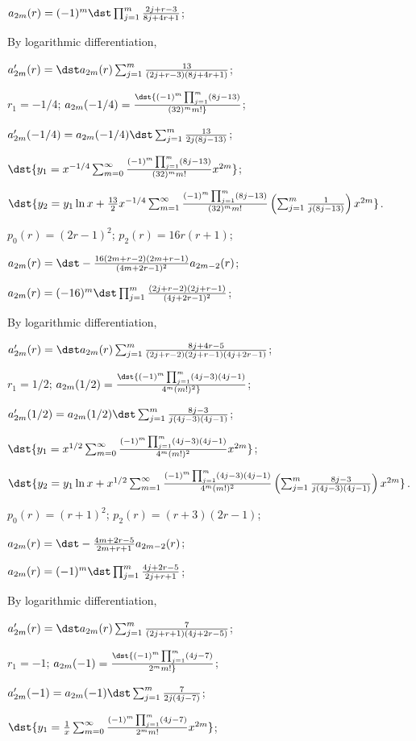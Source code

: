 \documentclass[dvips]{book}
\renewcommand{\exer}[1]{\par\medskip\;\noindent{\color{red}\bf #1.}}
\numberwithin{example}{section}
\numberwithin{equation}{section}
\numberwithin{theorem}{section}
\numberwithin{table}{section}
\numberwithin{figure}{section}
\begin{document}
 $a_{2m}(r)=(-1)^m\dst\prod_{j=1}^m{2j+r-3\over8j+4r+1}$;

By logarithmic differentiation,

$a_{2m}'(r)=\dst a_{2m}(r)\sum_{j=1}^m{13\over(2j+r-3)(8j+4r+1)}$;

$r_1=-1/4$;
$a_{2m}(-1/4)=\dst{(-1)^m\prod_{j=1}^m(8j-13)\over(32)^mm!}$;

$a_{2m}'(-1/4)=a_{2m}(-1/4)\dst\sum_{j=1}^m{13\over2j(8j-13)}$;


$\dst{y_1=x^{-1/4}\sum_{m=0}^\infty{(-1)^m\prod_{j=1}^m(8j-13)\over(32)^mm!}
x^{2m}}$;

$\dst{y_2=y_1\ln
x+{13\over2}x^{-1/4}\sum_{m=1}^\infty{(-1)^m\prod_{j=1}^m(8j-13)\over(32)^mm!}
\left(\sum_{j=1}^m{1\over j(8j-13)}\right)x^{2m}}$.


\exer{7.6.36}
$p_0(r)=(2r-1)^2$;
$p_2(r)=16r(r+1)$;

$a_{2m}(r)=\dst-{16(2m+r-2)(2m+r-1)\over(4m+2r-1)^2}
a_{2m-2}(r)$;


$a_{2m}(r)=(-16)^m\dst\prod_{j=1}^m{(2j+r-2)(2j+r-1)\over(4j+2r-1)^2}$;

By logarithmic differentiation,

$a_{2m}'(r)=\dst
a_{2m}(r)\sum_{j=1}^m{8j+4r-5\over(2j+r-2)(2j+r-1)(4j+2r-1)}$;

$r_1=1/2$;
$a_{2m}(1/2)=\dst{(-1)^m\prod_{j=1}^m(4j-3)(4j-1)\over4^m(m!)^2}$;

$a_{2m}'(1/2)=a_{2m}(1/2)\dst\sum_{j=1}^m{8j-3\over j(4j-3) (4j-1)}$;


$\dst{y_1=x^{1/2}\sum_{m=0}^\infty{(-1)^m\prod_{j=1}^m(4j-3)(4j-1)\over4^m(m!)^2}
x^{2m}}$;

$\dst{y_2=y_1\ln
x+x^{1/2}\sum_{m=1}^\infty{(-1)^m\prod_{j=1}^m(4j-3)(4j-1)\over4^m(m!)^2}
\left(\sum_{j=1}^m{8j-3\over j(4j-3) (4j-1)}\right)x^{2m}}$.


\exer{7.6.38}
$p_0(r)=(r+1)^2$;
$p_2(r)=(r+3)(2r-1)$;

$a_{2m}(r)=\dst-{4m+2r-5\over2m+r+1}
a_{2m-2}(r)$;

 $a_{2m}(r)=(-1)^m\dst\prod_{j=1}^m{4j+2r-5\over2j+r+1}$;

By logarithmic differentiation,

$a_{2m}'(r)=\dst a_{2m}(r)\sum_{j=1}^m{7\over(2j+r+1)(4j+2r-5)}$;

$r_1=-1$;
$a_{2m}(-1)=\dst{(-1)^m\prod_{j=1}^m(4j-7)\over2^mm!}$;

$a_{2m}'(-1)=a_{2m}(-1)\dst\sum_{j=1}^m{7\over2j(4j-7)}$;

$\dst{y_1={1\over x
}\sum_{m=0}^\infty{(-1)^m\prod_{j=1}^m(4j-7)\over2^mm!} x^{2m}}$;
\end{document}
